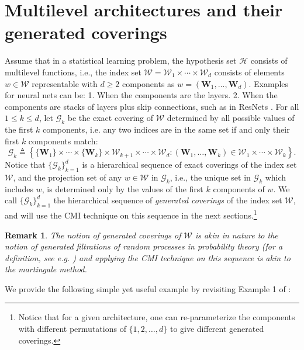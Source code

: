 \documentclass{article}
\newtheorem{remark}{Remark}
\newcommand{\W}[0]{\mathcal{W}}
\newcommand{\G}{\mathcal{G}}
\begin{document}
\section{Multilevel architectures and their generated coverings}\label{generated sequence of partitions section}
Assume that in a statistical learning problem, the hypothesis set $\mathcal{H}$ consists of multilevel functions, i.e., the index set $\W=\W_1\times \cdots \times\W_d$ consists of elements $w\in \W$ representable with $d\geq 2$ components as $w=(\mathbf{W}_1,\dots,\mathbf{W}_d)$. Examples for neural nets can be: 1. When the components are the layers. 2. When the components are stacks of layers plus skip connections, such as in ResNets \cite{he2016deep}. 
For all $1\leq k\leq d$, let $\G_k$ be the exact covering of $\W$ determined by all possible values of the first $k$ components, i.e. any two indices are in the same set if and only their first $k$ components match: 
\begin{equation}
	\mathcal{G}_k\triangleq  \left\{\{\mathbf{W}_1\}\times\cdots\times\{\mathbf{W}_k\}\times \W_{k+1}\times \cdots \times \W_d:  (\mathbf{W}_1,\dots,\mathbf{W}_k)\in \W_1\times \cdots \times \W_k \right\}.\nonumber
\end{equation}
Notice that $\{\G_k\}_{k=1}^d$ is a hierarchical sequence of exact coverings of the index set $\W$, and the projection set of any $w\in \W$ in $\G_k$, i.e., the unique set in $\G_k$ which includes $w$, is determined only by the values of the first $k$ components of $w$. We call $\{\G_k\}_{k=1}^d$ the hierarchical sequence of \emph{generated coverings} of the index set $\mathcal{W}$, and will use the CMI technique on this sequence in the next sections.\footnote{Notice that for a given architecture, one can re-parameterize the components with different permutations of $\{1,2,\dots,d\}$ to give different generated coverings.}
\begin{remark}\normalfont
	The notion of generated coverings of $\W$ is akin in nature to the notion of \emph{generated filtrations} of random processes in probability theory (for a definition, see e.g. \cite[p. 171]{ccinlar2011probability}) and applying the CMI technique on this sequence is akin to the \emph{martingale method}.
\end{remark}
We provide the following simple yet useful example by revisiting Example 1 of \cite{asadi2018chaining}:
\end{document}
